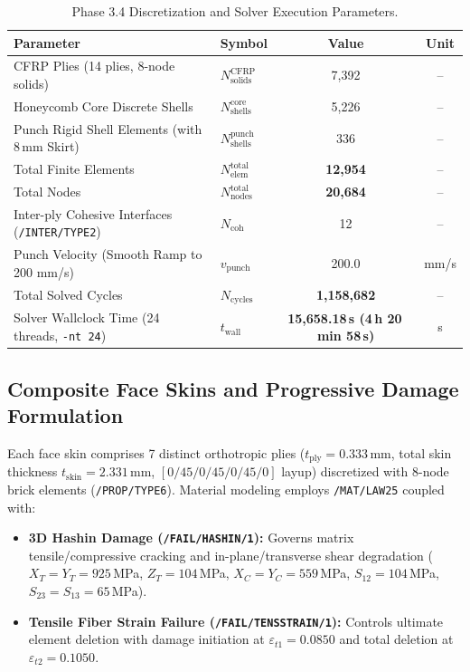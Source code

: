 \documentclass[11pt,a4paper]{article}
\begin{document}
\begin{table}[htbp]
\centering
\caption{Phase 3.4 Discretization and Solver Execution Parameters.}
\label{tab:phase34_params}
\begin{tabular}{@{}llcc@{}}
\toprule
\textbf{Parameter} & \textbf{Symbol} & \textbf{Value} & \textbf{Unit} \\
\midrule
CFRP Plies (14 plies, 8-node solids) & $N_{\text{solids}}^{\text{CFRP}}$ & 7,392 & -- \\
Honeycomb Core Discrete Shells & $N_{\text{shells}}^{\text{core}}$ & 5,226 & -- \\
Punch Rigid Shell Elements (with 8\,mm Skirt) & $N_{\text{shells}}^{\text{punch}}$ & 336 & -- \\
Total Finite Elements & $N_{\text{elem}}^{\text{total}}$ & \textbf{12,954} & -- \\
Total Nodes & $N_{\text{nodes}}^{\text{total}}$ & \textbf{20,684} & -- \\
Inter-ply Cohesive Interfaces (\texttt{/INTER/TYPE2}) & $N_{\text{coh}}$ & 12 & -- \\
Punch Velocity (Smooth Ramp to 200 mm/s) & $v_{\text{punch}}$ & 200.0 & mm/s \\
Total Solved Cycles & $N_{\text{cycles}}$ & \textbf{1,158,682} & -- \\
Solver Wallclock Time (24 threads, \texttt{-nt 24}) & $t_{\text{wall}}$ & \textbf{15,658.18\,s (4\,h 20\,min 58\,s)} & s \\
\bottomrule
\end{tabular}
\end{table}

\subsection{Composite Face Skins and Progressive Damage Formulation}
Each face skin comprises 7 distinct orthotropic plies ($t_{\text{ply}} = 0.333$\,mm, total skin thickness $t_{\text{skin}} = 2.331$\,mm, $[0/45/0/45/0/45/0]$ layup) discretized with 8-node brick elements (\texttt{/PROP/TYPE6}). Material modeling employs \texttt{/MAT/LAW25} coupled with:
\begin{itemize}
    \item \textbf{3D Hashin Damage (\texttt{/FAIL/HASHIN/1}):} Governs matrix tensile/compressive cracking and in-plane/transverse shear degradation ($X_T = Y_T = 925$\,MPa, $Z_T = 104$\,MPa, $X_C = Y_C = 559$\,MPa, $S_{12} = 104$\,MPa, $S_{23} = S_{13} = 65$\,MPa).
    \item \textbf{Tensile Fiber Strain Failure (\texttt{/FAIL/TENSSTRAIN/1}):} Controls ultimate element deletion with damage initiation at $\varepsilon_{t1} = 0.0850$ and total deletion at $\varepsilon_{t2} = 0.1050$.
\end{itemize}
\end{document}
